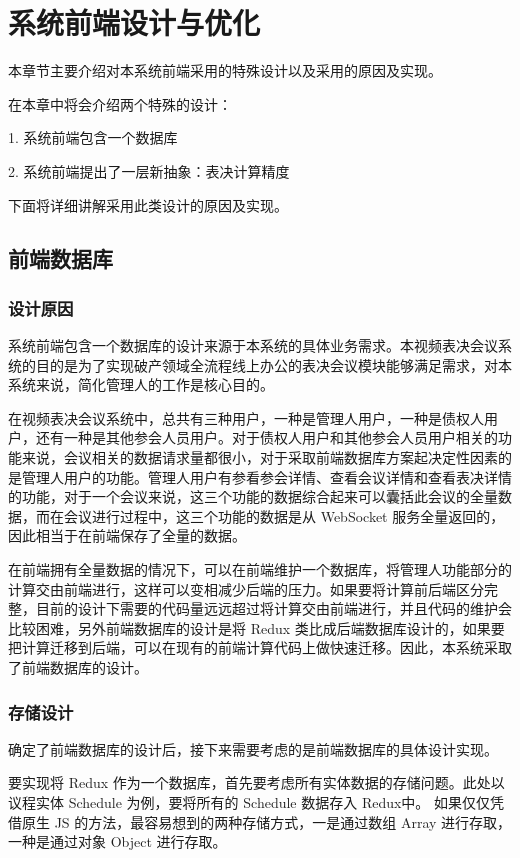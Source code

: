 
\chapter{系统前端设计与优化}
本章节主要介绍对本系统前端采用的特殊设计以及采用的原因及实现。

在本章中将会介绍两个特殊的设计：

1. 系统前端包含一个数据库

2. 系统前端提出了一层新抽象：表决计算精度

下面将详细讲解采用此类设计的原因及实现。

\section{前端数据库}

\subsection{设计原因}

系统前端包含一个数据库的设计来源于本系统的具体业务需求。本视频表决会议系统的目的是为了实现破产领域全流程线上办公的表决会议模块能够满足需求，对本系统来说，简化管理人的工作是核心目的。

在视频表决会议系统中，总共有三种用户，一种是管理人用户，一种是债权人用户，还有一种是其他参会人员用户。对于债权人用户和其他参会人员用户相关的功能来说，会议相关的数据请求量都很小，对于采取前端数据库方案起决定性因素的是管理人用户的功能。管理人用户有参看参会详情、查看会议详情和查看表决详情的功能，对于一个会议来说，这三个功能的数据综合起来可以囊括此会议的全量数据，而在会议进行过程中，这三个功能的数据是从 WebSocket 服务全量返回的，因此相当于在前端保存了全量的数据。

在前端拥有全量数据的情况下，可以在前端维护一个数据库，将管理人功能部分的计算交由前端进行，这样可以变相减少后端的压力。如果要将计算前后端区分完整，目前的设计下需要的代码量远远超过将计算交由前端进行，并且代码的维护会比较困难，另外前端数据库的设计是将 Redux 类比成后端数据库设计的，如果要把计算迁移到后端，可以在现有的前端计算代码上做快速迁移。因此，本系统采取了前端数据库的设计。

\subsection{存储设计}

确定了前端数据库的设计后，接下来需要考虑的是前端数据库的具体设计实现。

要实现将 Redux 作为一个数据库，首先要考虑所有实体数据的存储问题。此处以议程实体 Schedule 为例，要将所有的 Schedule 数据存入 Redux中。 如果仅仅凭借原生 JS 的方法，最容易想到的两种存储方式，一是通过数组 Array 进行存取，一种是通过对象 Object 进行存取。


